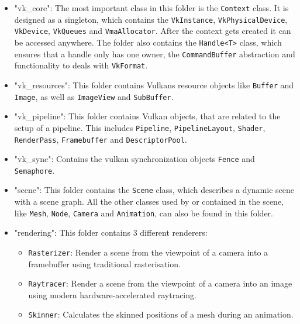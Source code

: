 \begin{itemize}
    \item "vk\_core": The most important class in this folder is the \texttt{Context} class. It is designed as a singleton, which contains the \texttt{VkInstance}, \texttt{VkPhysicalDevice}, \texttt{VkDevice}, \texttt{VkQueues} and \texttt{VmaAllocator}. After the context gets created it can be accessed anywhere. The folder also contains the \texttt{Handle<T>} class, which ensures that a handle only has one owner, the \texttt{CommandBuffer} abstraction and functionality to deals with \texttt{VkFormat}.
    \item "vk\_resources": This folder contains Vulkans resource objects like \texttt{Buffer} and \texttt{Image}, as well as \texttt{ImageView} and \texttt{SubBuffer}.
    \item "vk\_pipeline": This folder contains Vulkan objects, that are related to the setup of a pipeline. This includes \texttt{Pipeline}, \texttt{PipelineLayout}, \texttt{Shader}, \texttt{RenderPass}, \texttt{Framebuffer} and \texttt{DescriptorPool}.
    \item "vk\_sync": Contains the vulkan synchronization objects \texttt{Fence} and \texttt{Semaphore}.
    \item "scene": This folder contains the \texttt{Scene} class, which describes a dynamic scene with a scene graph. All the other classes used by or contained in the scene, like \texttt{Mesh}, \texttt{Node}, \texttt{Camera} and \texttt{Animation}, can also be found in this folder.
    \item "rendering": This folder contains 3 different renderers:
    \begin{itemize}
        \item \texttt{Rasterizer}: Render a scene from the viewpoint of a camera into a framebuffer using traditional rasterisation.
        \item \texttt{Raytracer}: Render a scene from the viewpoint of a camera into an image using modern hardware-accelerated raytracing.
        \item \texttt{Skinner}: Calculates the skinned positions of a mesh during an animation.
    \end{itemize}
\end{itemize}



